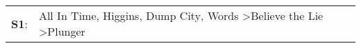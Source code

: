 \begin{supertabular}{p{0.03\textwidth}p{0.92\textwidth}}
 \textbf{S1}:  &  All In Time\textsuperscript{}, \enspace Higgins\textsuperscript{}, \enspace Dump City\textsuperscript{}, \enspace Words\textsuperscript{} \textgreater \enspace Believe the Lie\textsuperscript{} \textgreater \enspace Plunger\textsuperscript{}  \enspace  \\
\end{supertabular}
